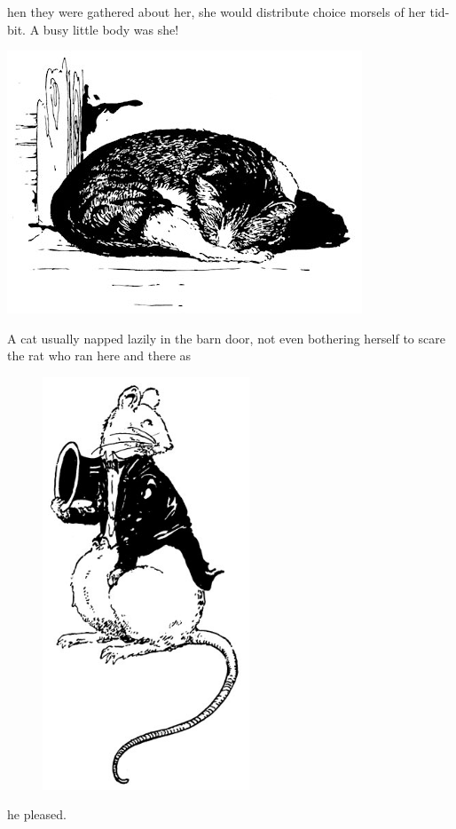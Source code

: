 \documentclass[letterpaper, 10pt, openany]{memoir}
\begin{document}
hen they were gathered about her, she would distribute choice morsels of her tid-bit.
A busy little body was she!

\begin{center}
	\includegraphics[scale=0.5]{image_007_2.jpg}
\end{center}

\vspace{\onelineskip}

A cat usually napped lazily in the barn door, not even bothering herself to scare the rat
who ran here and there as

\newpage
\begin{figure}
	\includegraphics[width=0.55\textwidth]{image_008.jpg}
\end{figure}
he pleased.
\end{document}
